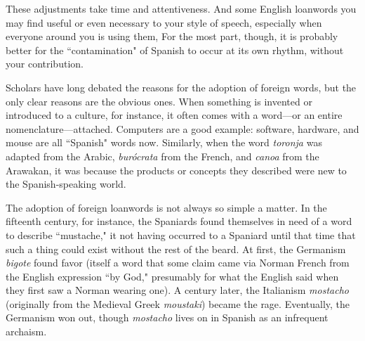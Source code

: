 These adjustments take time and attentiveness. And some English loanwords you may find useful or even necessary to your style
of speech, especially when everyone around you is using them, For
the most part, though, it is probably better for the ``contamination" of
Spanish to occur at its own rhythm, without your contribution.

Scholars have long debated the reasons for the adoption of
foreign words, but the only clear reasons are the obvious ones. When
something is invented or introduced to a culture, for instance, it often
comes with a word---or an entire nomenclature---attached. Computers
are a good example: software, hardware, and mouse are all ``Spanish"
words now. Similarly, when the word \emph{toronja} was adapted from the
Arabic, \emph{burócrata} from the French, and \emph{canoa} from the Arawakan, it
was because the products or concepts they described were new to the
Spanish-speaking world.

The adoption of foreign loanwords is not always so simple
a matter. In the fifteenth century, for instance, the Spaniards found
themselves in need of a word to describe ``mustache," it not having occurred to a Spaniard until that time that such a thing could exist without the rest of the beard. At first, the Germanism \emph{bigote} found favor
(itself a word that some claim came via Norman French from the English expression ``by God," presumably for what the English said when
they first saw a Norman wearing one). A century later, the Italianism
\emph{mostacho} (originally from the Medieval Greek \emph{moustaki}) became the
rage. Eventually, the Germanism won out, though \emph{mostacho} lives on
in Spanish as an infrequent archaism.

